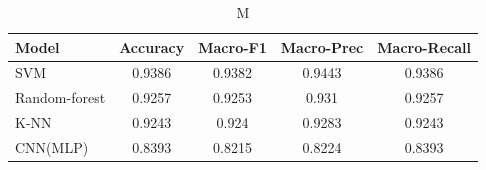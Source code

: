 \begin{table}[h!]
\centering
\caption{M}
\begin{tabular}{lcccc}
\toprule
\textbf{Model} & \textbf{Accuracy} & \textbf{Macro-F1} & \textbf{Macro-Prec} & \textbf{Macro-Recall} \\
\midrule
SVM&0.9386&0.9382&0.9443&0.9386\\ 
Random-forest&0.9257&0.9253&0.931&0.9257\\ 
K-NN&0.9243&0.924&0.9283&0.9243\\ 
CNN(MLP)&0.8393&0.8215&0.8224&0.8393\\ 
\bottomrule
\end{tabular}
\label{tab:M}
\end{table}
